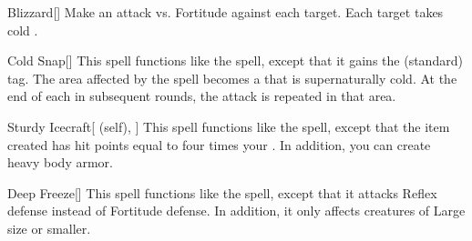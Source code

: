 \lowercase{\hypertarget{spell:Blizzard}{}}\label{spell:Blizzard}
\begin{freeability}[Rank 3]{\hypertarget{spell:Blizzard}{Blizzard}}[]
Make an attack vs. Fortitude against each target.
\hit Each target takes cold .
\end{freeability}
\vspace{0.25em}



\lowercase{\hypertarget{spell:Cold Snap}{}}\label{spell:Cold Snap}
\begin{freeability}[Rank 3]{\hypertarget{spell:Cold Snap}{Cold Snap}}[]
This spell functions like the  spell, except that it gains the  (standard) tag.
The area affected by the spell becomes a  that is supernaturally cold.
At the end of each  in subsequent rounds, the attack is repeated in that area.
\end{freeability}
\vspace{0.25em}



\lowercase{\hypertarget{spell:Sturdy Icecraft}{}}\label{spell:Sturdy Icecraft}
\begin{attuneability}[Rank 3]{\hypertarget{spell:Sturdy Icecraft}{Sturdy Icecraft}}[ (self), ]
This spell functions like the  spell, except that the item created has hit points equal to four times your .
In addition, you can create heavy body armor.
\end{attuneability}
\vspace{0.25em}



\lowercase{\hypertarget{spell:Deep Freeze}{}}\label{spell:Deep Freeze}
\begin{freeability}[Rank 4]{\hypertarget{spell:Deep Freeze}{Deep Freeze}}[]
This spell functions like the  spell, except that it attacks Reflex defense instead of Fortitude defense.
In addition, it only affects creatures of Large size or smaller.
\end{freeability}
\vspace{0.25em}



